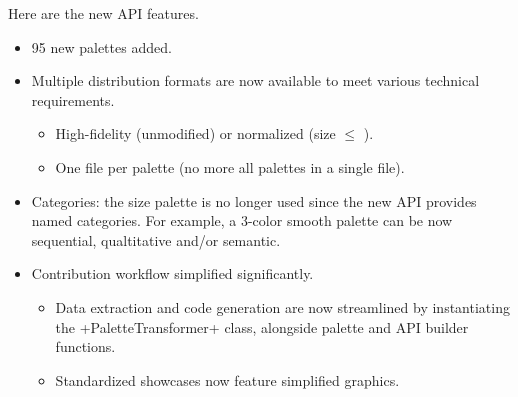\documentclass{tutodoc}
\begin{document}
\begin{tdocnew}
    \item Here are the new API features.
    \begin{itemize}
        \item 95 new palettes added.


        \item Multiple distribution formats are now available to meet various technical requirements.
        \begin{itemize}
            \item High-fidelity (unmodified) or normalized (size $\leq$ \palMaxSemSize).

            \item One file per palette (no more all palettes in a single file).
        \end{itemize}


        \item Categories: the size palette is no longer used since the new API provides named categories. For example, a 3-color smooth palette can be now sequential, qualtitative and/or semantic.


        \item Contribution workflow simplified significantly.
        \begin{itemize}
            \item Data extraction and code generation are now streamlined by instantiating the +PaletteTransformer+ class, alongside palette and API builder functions.

            \item Standardized showcases now feature simplified graphics.
        \end{itemize}
    \end{itemize}
\end{tdocnew}


\end{document}
